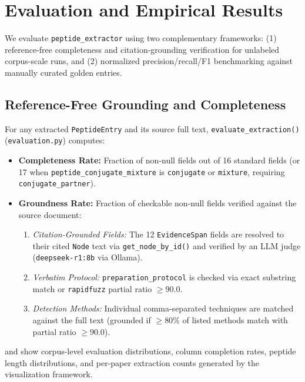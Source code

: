 \section{Evaluation and Empirical Results}
\label{sec:evaluation}

We evaluate \texttt{peptide\_extractor} using two complementary frameworks: (1) reference-free completeness and citation-grounding verification for unlabeled corpus-scale runs, and (2) normalized precision/recall/F1 benchmarking against manually curated golden entries.

\subsection{Reference-Free Grounding and Completeness}
For any extracted \texttt{PeptideEntry} and its source full text, \texttt{evaluate\_extraction()} (\texttt{evaluation.py}) computes:
\begin{itemize}
    \item \textbf{Completeness Rate:} Fraction of non-null fields out of 16 standard fields (or 17 when \texttt{peptide\_conjugate\_mixture} is \texttt{conjugate} or \texttt{mixture}, requiring \texttt{conjugate\_partner}).
    \item \textbf{Groundness Rate:} Fraction of checkable non-null fields verified against the source document:
    \begin{enumerate}
        \item \emph{Citation-Grounded Fields:} The 12 \texttt{EvidenceSpan} fields are resolved to their cited \texttt{Node} text via \texttt{get\_node\_by\_id()} and verified by an LLM judge (\texttt{deepseek-r1:8b} via Ollama).
        \item \emph{Verbatim Protocol:} \texttt{preparation\_protocol} is checked via exact substring match or \texttt{rapidfuzz} partial ratio $\ge 90.0$.
        \item \emph{Detection Methods:} Individual comma-separated techniques are matched against the full text (grounded if $\ge 80\%$ of listed methods match with partial ratio $\ge 90.0$).
    \end{enumerate}
\end{itemize}

 and  show corpus-level evaluation distributions, column completion rates, peptide length distributions, and per-paper extraction counts generated by the visualization framework.

